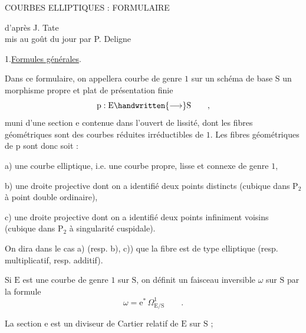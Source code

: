 \begin{center}
COURBES ELLIPTIQUES : FORMULAIRE

d'après J. Tate\\
mis au goût du jour par P. Deligne
\end{center}

1.\qquad \uline{Formules générales}.

Dans ce formulaire, on appellera courbe de genre $1$ sur un schéma de base $\mathrm{S}$ un morphisme propre et plat de présentation finie
\[
\mathrm{p}:\mathrm{E}\handwritten{\longrightarrow}\mathrm{S}\qquad,
\]
muni d'une section $\mathrm{e}$ contenue dans l'ouvert de lissité, dont les fibres géométriques sont des courbes réduites irréductibles de \reversemarginpar{}\normalmarginpar $1$. Les fibres géométriques de $\mathrm{p}$ sont donc soit :

a) une courbe elliptique, i.e. une courbe propre, lisse et connexe de genre $1$,

b) une droite projective dont on a identifié deux points distincts (cubique dans $\mathrm{P}_{2}$ à point double ordinaire),

c) une droite projective dont on a identifié deux points infiniment voisins (cubique dans $\mathrm{P}_{2}$ à singularité cuspidale).

On dira dans le cas a) (resp. b), c)) que la fibre est de type elliptique (resp. multiplicatif, resp. additif).

Si $\mathrm{E}$ est une courbe de genre $1$ sur $\mathrm{S}$, on définit un faisceau inversible $\omega$ sur $\mathrm{S}$ par la formule
\[
\omega=\mathrm{e}^{*}\,\Omega^{1}_{\mathrm{E}/\mathrm{S}}\qquad.
\]

La section $\mathrm{e}$ est un diviseur de Cartier relatif de $\mathrm{E}$ sur $\mathrm{S}$ ;
\clearpage
